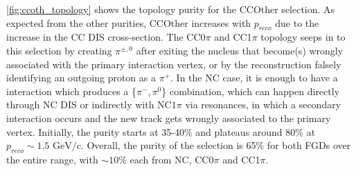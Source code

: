 
\autoref{fig:ccoth_topology} shows the topology purity for the CCOther selection. As expected from the other purities, CCOther increases with $p_{reco}$ due to the increase in the CC DIS cross-section. The CC0$\pi$ and CC1$\pi$ topology seeps in to this selection by creating $\pi^{\pm,0}$ after exiting the nucleus that become(s) wrongly associated with the primary interaction vertex, or by the reconstruction falsely identifying an outgoing proton as a $\pi^+$. In the NC case, it is enough to have a interaction which produces a \{$\pi^-, \pi^0$\} combination, which can happen directly through NC DIS or indirectly with NC$1\pi$ via resonances, in which a secondary interaction occurs and the new track gets wrongly associated to the primary vertex. Initially, the purity starts at 35-40\% and plateaus around 80\% at $p_{reco} \sim 1.5\text{ GeV/c}$. Overall, the purity of the selection is 65\% for both FGDs over the entire range, with $\sim10\%$ each from NC, CC0$\pi$ and CC1$\pi$.
